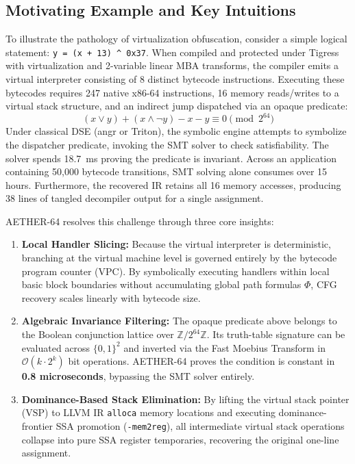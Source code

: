 \documentclass[11pt,a4paper]{article}
\begin{document}
\subsection{Motivating Example and Key Intuitions}
To illustrate the pathology of virtualization obfuscation, consider a simple logical statement: \texttt{y = (x + 13) \^{} 0x37}. When compiled and protected under Tigress with virtualization and 2-variable linear MBA transforms, the compiler emits a virtual interpreter consisting of 8 distinct bytecode instructions. Executing these bytecodes requires 247 native x86-64 instructions, 16 memory reads/writes to a virtual stack structure, and an indirect jump dispatched via an opaque predicate:
\begin{equation}
(x \lor y) + (x \land \neg y) - x - y \equiv 0 \pmod{2^{64}}
\end{equation}
Under classical DSE (angr or Triton), the symbolic engine attempts to symbolize the dispatcher predicate, invoking the SMT solver to check satisfiability. The solver spends 18.7~ms proving the predicate is invariant. Across an application containing 50,000 bytecode transitions, SMT solving alone consumes over 15 hours. Furthermore, the recovered IR retains all 16 memory accesses, producing 38 lines of tangled decompiler output for a single assignment.

AETHER-64 resolves this challenge through three core insights:
\begin{enumerate}
    \item \textbf{Local Handler Slicing:} Because the virtual interpreter is deterministic, branching at the virtual machine level is governed entirely by the bytecode program counter ($\text{VPC}$). By symbolically executing handlers within local basic block boundaries without accumulating global path formulas $\Phi$, CFG recovery scales linearly with bytecode size.
    \item \textbf{Algebraic Invariance Filtering:} The opaque predicate above belongs to the Boolean conjunction lattice over $\mathbb{Z}/2^{64}\mathbb{Z}$. Its truth-table signature can be evaluated across $\{0, 1\}^2$ and inverted via the Fast Moebius Transform in $\mathcal{O}(k \cdot 2^k)$ bit operations. AETHER-64 proves the condition is constant in \textbf{0.8 microseconds}, bypassing the SMT solver entirely.
    \item \textbf{Dominance-Based Stack Elimination:} By lifting the virtual stack pointer ($\text{VSP}$) to LLVM IR \texttt{alloca} memory locations and executing dominance-frontier SSA promotion (\texttt{-mem2reg}), all intermediate virtual stack operations collapse into pure SSA register temporaries, recovering the original one-line assignment.
\end{enumerate}
\end{document}
